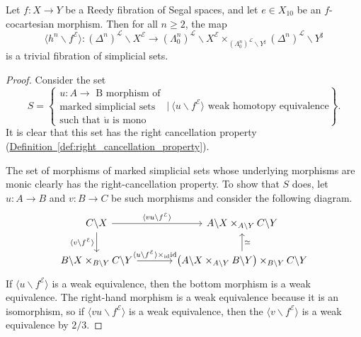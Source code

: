 \documentclass[main.tex]{subfiles}
\begin{document}
\begin{proposition}
  \label{prop:segal_cocartesian_morphisms_are_quasicategory_cocartesian}
  Let $f\colon X \to Y$ be a Reedy fibration of Segal spaces, and let $e \in X_{10}$ be an $f$-cocartesian morphism. Then for all $n \geq 2$, the map
  \begin{equation*}
    \langle h^{n} \backslash f^{\mathcal{E}} \rangle\colon (\Delta^{n})^{\mathcal{L}} \backslash X^{\mathcal{E}} \to (\Lambda^{n}_{0})^{\mathcal{L}} \backslash X^{\mathcal{E}} \times_{(\Lambda^{n}_{0})^{\mathcal{L}} \backslash Y^{\sharp}} (\Delta^{n})^{\mathcal{L}} \backslash Y^{\sharp}
  \end{equation*}
  is a trivial fibration of simplicial sets.
\end{proposition}
\begin{proof}
  Consider the set
  \begin{equation*}
    S =
    \left\{
      \substack{
        u\colon A \to \text{ B morphism of} \\
        \text{marked simplicial sets} \\
        \text{such that $\mathring{u}$ is mono}
      }
      \ \bigg| \
      \langle u \backslash f^{\mathcal{E}} \rangle \text{ weak homotopy equivalence}
    \right\}.
  \end{equation*}
  It is clear that this set has the right cancellation property (\hyperref[def:right_cancellation_property]{Definition~\ref*{def:right_cancellation_property}}).

  The set of morphisms of marked simplicial sets whose underlying morphisms are monic clearly has the right-cancellation property. To show that $S$ does, let $u\colon A \to B$ and $v\colon B \to C$ be such morphisms and consider the following diagram.
  \begin{equation*}
    \begin{tikzcd}[column sep=large]
      C \backslash X
      \arrow[r, "\langle vu \backslash f^{\mathcal{E}} \rangle"]
      \arrow[d, swap, "\langle v \backslash f^{\mathcal{E}} \rangle"]
      & A \backslash X \times_{A \backslash Y} C \backslash Y
      \\
      B \backslash X \times_{B \backslash Y} C \backslash Y
      \arrow[r, "\langle u \backslash f^{\mathcal{E}} \rangle \times_{\id} \id"]
      & \left( A \backslash X \times_{A \backslash Y} B \backslash Y \right) \times_{B \backslash Y} C \backslash Y
      \arrow[u, swap, "\simeq"]
    \end{tikzcd}
  \end{equation*}
  If $\langle u \backslash f^{\mathcal{E}} \rangle$ is a weak equivalence, then the bottom morphism is a weak equivalence. The right-hand morphism is a weak equivalence because it is an isomorphism, so if $\langle vu \backslash f^{\mathcal{E}} \rangle$ is a weak equivalence, then the $\langle v \backslash f^{\mathcal{E}} \rangle$ is a weak equivalence by $2 / 3$.


\end{proof}
\end{document}

